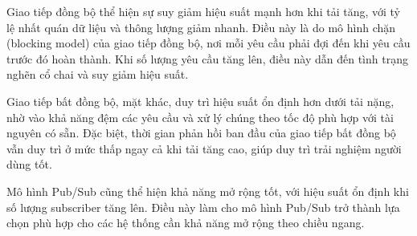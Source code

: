Giao tiếp đồng bộ thể hiện sự suy giảm hiệu suất mạnh hơn khi tải tăng, với tỷ lệ nhất quán dữ liệu và thông lượng giảm nhanh. Điều này là do mô hình chặn (blocking model) của giao tiếp đồng bộ, nơi mỗi yêu cầu phải đợi đến khi yêu cầu trước đó hoàn thành. Khi số lượng yêu cầu tăng lên, điều này dẫn đến tình trạng nghẽn cổ chai và suy giảm hiệu suất.

Giao tiếp bất đồng bộ, mặt khác, duy trì hiệu suất ổn định hơn dưới tải nặng, nhờ vào khả năng đệm các yêu cầu và xử lý chúng theo tốc độ phù hợp với tài nguyên có sẵn. Đặc biệt, thời gian phản hồi ban đầu của giao tiếp bất đồng bộ vẫn duy trì ở mức thấp ngay cả khi tải tăng cao, giúp duy trì trải nghiệm người dùng tốt.

Mô hình Pub/Sub cũng thể hiện khả năng mở rộng tốt, với hiệu suất ổn định khi số lượng subscriber tăng lên. Điều này làm cho mô hình Pub/Sub trở thành lựa chọn phù hợp cho các hệ thống cần khả năng mở rộng theo chiều ngang.